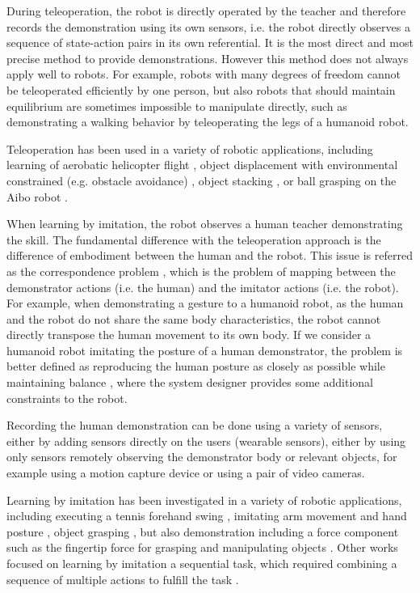 During teleoperation, the robot is directly operated by the teacher and therefore records the demonstration using its own sensors, i.e. the robot directly observes a sequence of state-action pairs in its own referential. It is the most direct and most precise method to provide demonstrations. However this method does not always apply well to robots. For example, robots with many degrees of freedom cannot be teleoperated efficiently by one person, but also robots that should maintain equilibrium are sometimes impossible to manipulate directly, such as demonstrating a walking behavior by teleoperating the legs of a humanoid robot.

Teleoperation has been used in a variety of robotic applications, including learning of aerobatic helicopter flight \cite{abbeel2007application}, object displacement with environmental constrained (e.g. obstacle avoidance) \cite{guenter2007reinforcement,calinon2007teacher}, object stacking \cite{calinon2007teacher}, or ball grasping on the Aibo robot \cite{grollman2007learning}.

When learning by imitation, the robot observes a human teacher demonstrating the skill. The fundamental difference with the teleoperation approach is the difference of embodiment between the human and the robot. This issue is referred as the correspondence problem \cite{nehaniv2002correspondence}, which is the problem of mapping between the demonstrator actions (i.e. the human) and the imitator actions (i.e. the robot). For example, when demonstrating a gesture to a humanoid robot, as the human and the robot do not share the same body characteristics, the robot cannot directly transpose the human movement to its own body. If we consider a humanoid robot imitating the posture of a human demonstrator, the problem is better defined as reproducing the human posture as closely as possible while maintaining balance \cite{hyon2007full,yamane2009simultaneous}, where the system designer provides some additional constraints to the robot.

Recording the human demonstration can be done using a variety of sensors, either by adding sensors directly on the users (wearable sensors), either by using only sensors remotely observing the demonstrator body or relevant objects, for example using a motion capture device or using a pair of video cameras.

Learning by imitation has been investigated in a variety of robotic applications, including executing a tennis forehand swing \cite{ijspeert2002movement}, imitating arm movement \cite{billard2001learning} and hand posture \cite{chella2004posture}, object grasping \cite{lopes2005visual,tegin2009demonstration}, but also demonstration including a force component such as the fingertip force for grasping and manipulating objects \cite{lin2012learning}. Other works focused on learning by imitation a sequential task, which required combining a sequence of multiple actions to fulfill the task \cite{pardowitz2005learning,natarajan2011imitation}.

